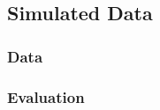 \documentclass{article}
\begin{document}
\subsection{Simulated Data}


\subsubsection{Data}
\subsubsection{Evaluation} 
\end{document}
